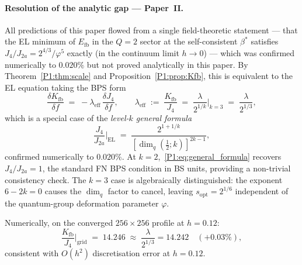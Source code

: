 \documentclass[11pt,a4paper]{article}
\theoremstyle{definition}
\theoremstyle{remark}
\newcommand{\vp}{\varphi}
\newcommand{\lam}{\lambda}
\newcommand{\bst}{\beta^{*}}
\newcommand{\Kfb}{K_{\mathrm{fb}}}
\newcommand{\Efb}{E_{\mathrm{fb}}}
\newcommand{\Ja}{J_{2a}}
\newcommand{\Jfour}{J_{4}}
\newcommand{\sopt}{s_{\mathrm{opt}}}
\newcommand{\leff}{\lambda_{\mathrm{eff}}}
\begin{document}
\newpage
\paragraph{Resolution of the analytic gap --- Paper~II.}
All predictions of this paper flowed from a single field-theoretic
statement --- that the EL minimum of $\Efb$ in the $Q=2$ sector
at the self-consistent $\bst$ satisfies $\Jfour/\Ja = 2^{4/3}/\vp^5$
exactly (in the continuum limit $h\to0$) --- which was confirmed
numerically to $0.020\%$ but not proved analytically in this paper.
By Theorem~\ref{P1:thm:scale} and Proposition~\ref{P1:prop:Kfb}, this is
equivalent to the EL equation taking the BPS form
\begin{equation}
  \frac{\delta\Kfb}{\delta f} \;=\; -\leff\,\frac{\delta\Jfour}{\delta f},
  \qquad
  \leff \;:=\; \frac{\Kfb}{\Jfour} \;=\; \frac{\lam}{2^{1/k}}\bigg|_{k=3}
  \;=\; \frac{\lam}{2^{1/3}},
  \label{P1:eq:BPS_EL}
\end{equation}
which is a special case of the \emph{level-$k$ general formula}
\begin{equation}
  \frac{\Jfour}{\Ja}\bigg|_{\mathrm{EL}}
  \;=\; \frac{2^{1+1/k}}{[\dim_q(\tfrac{1}{2};k)]^{2k-1}},
  \label{P1:eq:general_formula}
\end{equation}
confirmed numerically to $0.020\%$.
At $k=2$,~\eqref{P1:eq:general_formula} recovers $\Jfour/\Ja=1$,
the standard FN BPS condition in BS units, providing a non-trivial
consistency check.
The $k=3$ case is algebraically distinguished: the exponent $6-2k=0$
causes the $\dim_q$ factor to cancel, leaving $\sopt = 2^{1/6}$
independent of the quantum-group deformation parameter $\vp$.

Numerically, on the converged $256\times256$ profile at $h=0.12$:
\begin{equation}
  \frac{\Kfb}{\Jfour}\bigg|_{\mathrm{grid}}
  \;=\; 14.246
  \;\approx\; \frac{\lam}{2^{1/3}} = 14.242
  \quad (+0.03\%),
  \label{P1:eq:leff_numerical}
\end{equation}
consistent with $O(h^2)$ discretisation error at $h=0.12$.
\end{document}
